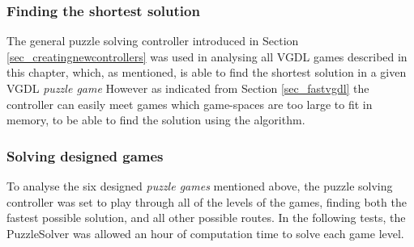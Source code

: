 \documentclass[a4paper,titlepage,final]{report}
\begin{document}

\subsubsection*{Finding the shortest solution}
The general puzzle solving controller introduced in Section \ref{sec_creatingnewcontrollers} was used in analysing all VGDL games described in this chapter, which, as mentioned, is able to find the shortest solution in a given VGDL \textit{puzzle game}
However as indicated from Section \ref{sec_fastvgdl} the controller can easily meet games which game-spaces are too large to fit in memory, to be able to find the solution using the algorithm.



\subsubsection*{Solving designed games}
\label{sec_task3data}
To analyse the six designed \textit{puzzle games} mentioned above, the puzzle solving controller was set to play through all of the levels of the games, finding both the fastest possible solution, and all other possible routes.
In the following tests, the PuzzleSolver was allowed an hour of computation time to solve each game level.
\end{document}

